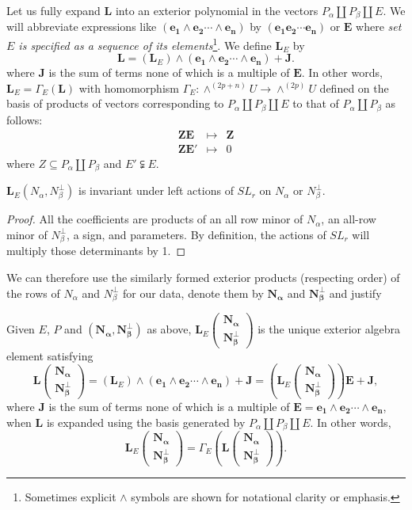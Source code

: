 \documentclass[Unicode]{cedram-alco}
\newcommand{\ext}[1]{\ensuremath{\mathbf{#1}}}
\newcommand{\dunion}{\coprod}
\newcommand{\extLVert}[2]{\ext{L}\left( \begin{array}{c} {#1}\\ {#2} \end{array} \right)}
\newcommand{\extLVertSub}[3]{\ext{L}_{#1}\left( \begin{array}{c} {#2}\\ {#3} \end{array} \right)}
\begin{document}
Let us fully expand $\ext{L}$ into an exterior polynomial in the vectors
$P_\alpha \dunion P_\beta \dunion E$.
We will abbreviate expressions like $(\ext{e_1}\wedge\ext{e_2}\cdots\wedge\ext{e_n})$ by
$(\ext{e_1}\ext{e_2}\cdots\ext{e_n})$ or $\ext{E}$ where
\emph{set $E$ is specified as a sequence of its elements}\footnote{
Sometimes explicit $\wedge$ symbols are shown for notational clarity or emphasis.}.
We define $\ext{L}_E$ by
\[
\ext{L} = (\ext{L}_E)\wedge (\ext{e_1}\wedge\ext{e_2}\cdots\wedge\ext{e_n}) + \ext{J}.
\]
where
$\ext{J}$ is the sum of terms none of which is a multiple of $\ext{E}$.
In other words, $\ext{L}_E=\Gamma_E(\ext{L})$ with homomorphism
$\Gamma_E:\wedge^{(2p+n)}U\rightarrow\wedge^{(2p)}U$ defined on the basis of
products of vectors corresponding to $P_\alpha \dunion P_\beta \dunion E$ to that
of $P_\alpha \dunion P_\beta$ as follows:
\[
   \begin{array}{ccc}
     \ext{Z}\ext{E} & \longmapsto & \ext{Z} \\
     \ext{Z}\ext{E'} & \longmapsto & 0
   \end{array}
\]
where $Z\subseteq P_\alpha \dunion P_\beta$ and $E'\subsetneqq E$.

\begin{prop}
  $\ext{L}_E(N_\alpha,N_\beta^\perp)$ is invariant under left actions of $SL_r$ on $N_\alpha$ or $N_\beta^\perp$.
\end{prop}
\begin{proof}
  All the coefficients are products of an all row minor of $N_\alpha$, an all-row minor of $N_\beta^\perp$, a sign, and
  parameters.
  By definition, the actions of $SL_r$ will multiply those determinants by 1. 
\end{proof}

We can therefore use the similarly formed exterior products
(respecting order) of the rows of $N_\alpha$ and $N_\beta^\perp$
for our data, denote them by 
$\ext{N_\alpha}$ and $\ext{N_\beta^\perp}$
and justify

\begin{defi}
  Given $E$, $P$ and $(\ext{N_\alpha},\ext{N_\beta^\perp})$ as above,
  $\extLVertSub{E}{\ext{N_\alpha}}{\ext{N_\beta^\perp}}$ is the
  unique exterior algebra element satisfying
  \[
  \extLVert{\ext{N_\alpha}}{\ext{N_\beta^\perp}}=
  (\ext{L}_E)\wedge (\ext{e_1}\wedge\ext{e_2}\cdots\wedge\ext{e_n}) + \ext{J} =
  (\extLVertSub{E}{\ext{N_\alpha}}{\ext{N_\beta^\perp}})\ext{E}+\ext{J},
  \]
where $\ext{J}$ is the sum of terms none of which is a multiple of
$\ext{E}=\ext{e_1}\wedge\ext{e_2}\cdots\wedge\ext{e_n}$, when
$\ext{L}$ is expanded using the basis generated by $P_\alpha \dunion
P_\beta \dunion E$.  In other words,
  \[ 
  \extLVertSub{E}
              {\ext{N_\alpha}}
              {\ext{N_\beta^\perp}}
              =
              \Gamma_E(
              \extLVert{\ext{N_\alpha}}{\ext{N_\beta^\perp}}).
  \]
\end{defi}
\end{document}
